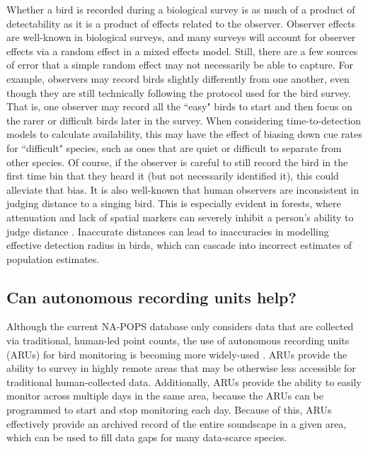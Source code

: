 \par Whether a bird is recorded during a biological survey is as much of a product of detectability as it is a product of effects related to the observer.
Observer effects are well-known in biological surveys, and many surveys will account for observer effects via a random effect in a mixed effects model.
Still, there are a few sources of error that a simple random effect may not necessarily be able to capture.
For example, observers may record birds slightly differently from one another, even though they are still technically following the protocol used for the bird survey.
That is, one observer may record all the ``easy" birds to start and then focus on the rarer or difficult birds later in the survey.
When considering time-to-detection models to calculate availability, this may have the effect of biasing down cue rates for ``difficult" species, such as ones that are quiet or difficult to separate from other species.
Of course, if the observer is careful to still record the bird in the first time bin that they heard it (but not necessarily identified it), this could alleviate that bias.
It is also well-known that human observers are inconsistent in judging distance to a singing bird.
This is especially evident in forests, where attenuation and lack of spatial markers can severely inhibit a person's ability to judge distance \citep{alldredge_field_2007}.
Inaccurate distances can lead to inaccuracies in modelling effective detection radius in birds, which can cascade into incorrect estimates of population estimates.

\subsection{Can autonomous recording units help?}

\par Although the current NA-POPS database only considers data that are collected via traditional, human-led point counts, the use of autonomous recording units (ARUs) for bird monitoring is becoming more widely-used \citep{perezgranados_estimating_2021, shonfield_autonomous_2017, sugai_terrestrial_2019}.
ARUs provide the ability to survey in highly remote areas that may be otherwise less accessible for traditional human-collected data.
Additionally, ARUs provide the ability to easily monitor across multiple days in the same area, because the ARUs can be programmed to start and stop monitoring each day.
Because of this, ARUs effectively provide an archived record of the entire soundscape in a given area, which can be used to fill data gaps for many data-scarce species.

